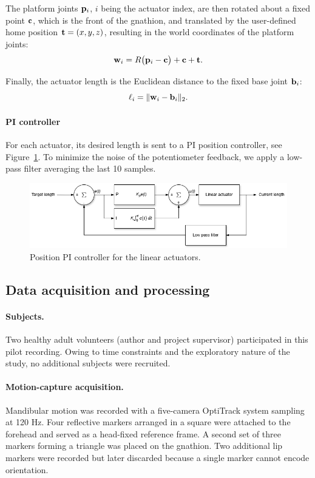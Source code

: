 The platform joints ${\bf p}_i$, $i$ being the actuator index, are then rotated about a fixed point ${\bf c}$, 
which is the front of the gnathion, and translated by the user-defined home position ${\bf t}=(x,y,z)$, 
resulting in the world coordinates of the platform joints:
\[
{\bf w}_i = R\bigl({\bf p}_i-{\bf c}\bigr)+{\bf c}+{\bf t}.
\]

Finally, the actuator length is the Euclidean distance to the fixed base joint ${\bf b}_i$:
\[
\ell_i = \lVert {\bf w}_i-{\bf b}_i\rVert_2.
\]

\paragraph{PI controller}
For each actuator, its desired length is sent to a PI position controller, see Figure~\ref{fig:actuator_pi}.
To minimize the noise of the potentiometer feedback, we apply a low-pass filter averaging the last 10 samples.
\begin{figure}[H]
\centering
\includegraphics[width=\textwidth]{figures/actuator_pi.drawio.png}
\caption{Position PI controller for the linear actuators.}
\label{fig:actuator_pi}
\end{figure}

\subsection{Data acquisition and processing}
\label{sec:motion-capture}

\paragraph{Subjects.} 
Two healthy adult volunteers (author and project supervisor) participated in this pilot recording. Owing to time constraints and the exploratory 
nature of the study, no additional subjects were recruited.

\paragraph{Motion-capture acquisition.}
Mandibular motion was recorded with a five-camera OptiTrack system sampling at 120 Hz.
Four reflective markers arranged in a square were attached to the forehead and served as a head-fixed reference frame.
A second set of three markers forming a triangle was placed on the gnathion.
Two additional lip markers were recorded but later discarded because a single marker cannot encode orientation. \cite{motion_capture_adult,motion_capture_children}

